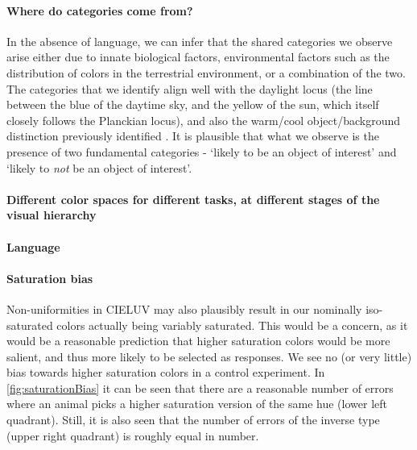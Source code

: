 
\clearpage 

\paragraph{Where do categories come from?}
In the absence of language, we can infer that the shared categories we observe arise either due to innate biological factors, environmental factors such as the distribution of colors in the terrestrial environment, or a combination of the two.
The categories that we identify align well with the daylight locus (the line between the blue of the daytime sky, and the yellow of the sun, which itself closely follows the Planckian locus), and also the warm/cool object/background distinction previously identified \citep{rosenthal_color_2018}. It is plausible that what we observe is the presence of two fundamental categories - `likely to be an object of interest' and `likely to \emph{not} be an object of interest'. 


\paragraph{Different color spaces for different tasks, at different stages of the visual hierarchy}

\paragraph{Language}



\paragraph{Saturation bias}

Non-uniformities in CIELUV may also plausibly result in our nominally iso-saturated colors actually being variably saturated. This would be a concern, as it would be a reasonable prediction that higher saturation colors would be more salient, and thus more likely to be selected as responses. We see no (or very little) bias towards higher saturation colors in a control experiment. In \autoref{fig:saturationBias} it can be seen that there are a reasonable number of errors where an animal picks a higher saturation version of the same hue (lower left quadrant). Still, it is also seen that the number of errors of the inverse type (upper right quadrant) is roughly equal in number.


